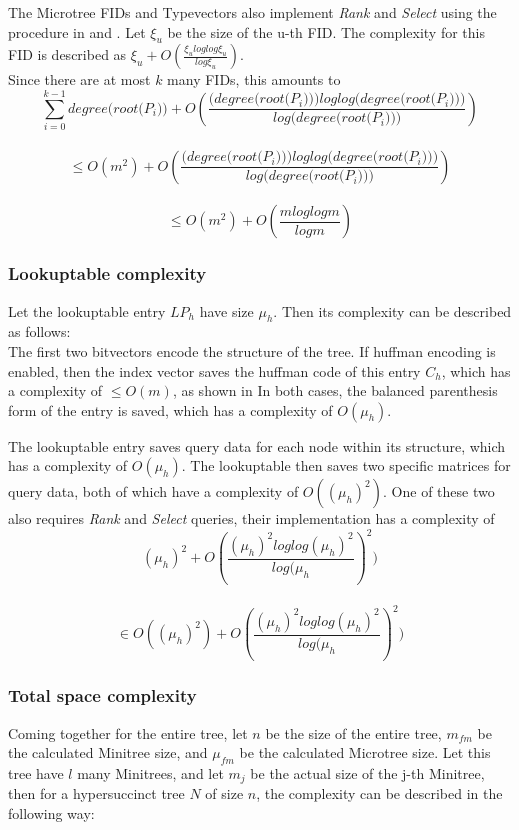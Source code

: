 \documentclass{article}
\begin{document}
The Microtree FIDs and Typevectors also implement \textit{Rank} and \textit{Select} using the procedure in \cite{succinctBV} and \cite{succinctBVLink}. Let $\xi_{u}$ be the size of the u-th FID.
The complexity for this FID is described as $\xi_{u} + O(\frac{\xi_{u} log log \xi_{u}}{log \xi_{u}})$.\\
Since there are at most $k$ many FIDs, this amounts to 
$$\displaystyle\sum_{i=0}^{k-1} \textit{degree(root($P_{i}$))} + O(\frac{(\textit{degree(root($P_{i}$)))} log log (\textit{degree(root($P_{i}$)))}}{log (\textit{degree(root($P_{i}$)))}})$$\\
$$\leq O(m^{2}) + O(\frac{(\textit{degree(root($P_{i}$)))} log log (\textit{degree(root($P_{i}$)))}}{log (\textit{degree(root($P_{i}$)))}})$$\\
$$\leq O(m^{2}) + O(\frac{m log log m}{log m})$$

\subsubsection{Lookuptable complexity}
Let the lookuptable entry $LP_{h}$ have size $\mu_{h}$. Then its complexity can be described as follows:\\

The first two bitvectors encode the structure of the tree.
If huffman encoding is enabled, then the index vector saves the huffman code of this entry $C_{h}$, which has a complexity of $\leq O(m)$, as shown in \cite{universalSuccinct} %
In both cases, the balanced parenthesis form of the entry is saved, which has a complexity of $O(\mu_{h})$.

The lookuptable entry saves query data for each node within its structure, which has a complexity of $O(\mu_{h})$.
The lookuptable then saves two specific matrices for query data, both of which have a complexity of $O((\mu_{h})^{2})$.
One of these two also requires \textit{Rank} and \textit{Select} queries, their implementation has a complexity of 
$$(\mu_{h})^{2} + O(\frac{(\mu_{h})^{2} log log (\mu_{h})^{2}}{log (\mu_{h}})^{2})$$\\
$$\in O((\mu_{h})^{2}) + O(\frac{(\mu_{h})^{2} log log (\mu_{h})^{2}}{log (\mu_{h}})^{2})$$

\subsubsection{Total space complexity}
Coming together for the entire tree, let $n$ be the size of the entire tree, $m_{fm}$ be the calculated Minitree size, and $\mu_{fm}$ be the calculated Microtree size. Let this tree have $l$ many Minitrees, and let $m_{j}$ be the actual size of the j-th Minitree, then for a hypersuccinct tree $N$ of size $n$, the complexity can be described in the following way:\\
\end{document}
